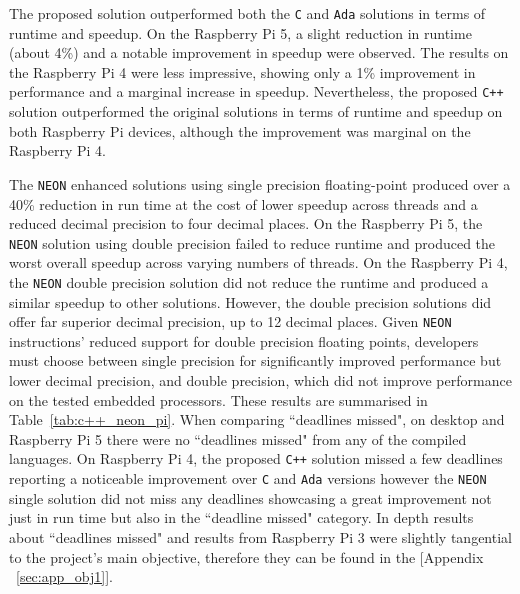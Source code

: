 
The proposed solution outperformed both the \texttt{C} and \texttt{Ada} solutions in terms of runtime and speedup. On the Raspberry Pi 5, a slight reduction in runtime (about 4\%) and a notable improvement in speedup were observed. The results on the Raspberry Pi 4 were less impressive, showing only a 1\% improvement in performance and a marginal increase in speedup. Nevertheless, the proposed \texttt{C++} solution outperformed the original solutions in terms of runtime and speedup on both Raspberry Pi devices, although the improvement was marginal on the Raspberry Pi 4.

The \texttt{NEON} enhanced solutions using single precision floating-point produced over a 40\% reduction in run time at the cost of lower speedup across threads and a reduced decimal precision to four decimal places. On the Raspberry Pi 5, the \texttt{NEON} solution using double precision failed to reduce runtime and produced the worst overall speedup across varying numbers of threads. On the Raspberry Pi 4, the \texttt{NEON} double precision solution did not reduce the runtime and produced a similar speedup to other solutions. However, the double precision solutions did offer far superior decimal precision, up to 12 decimal places. Given \texttt{NEON} instructions' reduced support for double precision floating points, developers must choose between single precision for significantly improved performance but lower decimal precision, and double precision, which did not improve performance on the tested embedded processors. These results are summarised in Table~\ref{tab:c++_neon_pi}. When comparing ``deadlines missed", on desktop and Raspberry Pi 5 there were no ``deadlines missed" from any of the compiled languages. On Raspberry Pi 4, the proposed \texttt{C++} solution missed a few deadlines reporting a noticeable improvement over \texttt{C} and \texttt{Ada} versions however the \texttt{NEON} single solution did not miss any deadlines showcasing a great improvement not just in run time but also in the ``deadline missed" category. In depth results about ``deadlines missed" and results from Raspberry Pi 3 were slightly tangential to the project's main objective, therefore they can be found in the [Appendix ~\ref{sec:app_obj1}].

